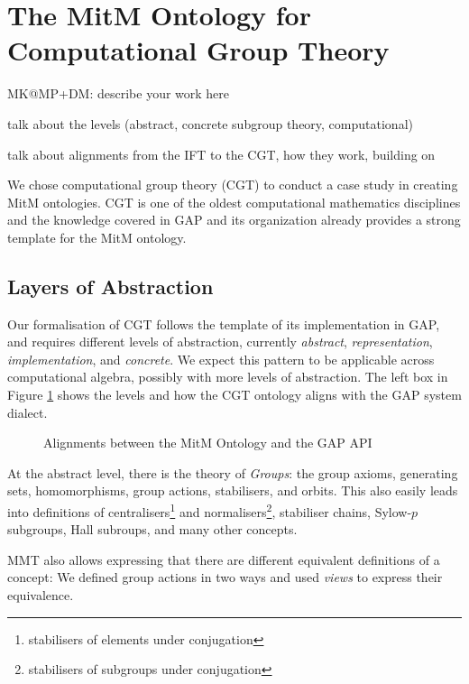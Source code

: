\section{The MitM Ontology for Computational Group Theory}\label{sec:cgt}
\begin{todolist}{MK@MP+DM: describe your work here}
\item talk about the levels (abstract, concrete subgroup theory, computational)
\item talk about alignments from the IFT to the CGT, how they work, building
  on~\cite{MueRoYuRa:abtafs17,MueGauKal:cacfms17} 
\end{todolist}

We chose computational group theory (CGT) to conduct a case study in creating MitM
ontologies. CGT is one of the oldest computational mathematics disciplines and the
knowledge covered in GAP and its organization already provides a strong template for the
MitM ontology.

\subsection{Layers of Abstraction}

Our formalisation of CGT follows the template of its implementation in GAP, and requires
different levels of abstraction, currently \emph{abstract}, \emph{representation},
\emph{implementation}, and \emph{concrete}.  We expect this pattern to be applicable
across computational algebra, possibly with more levels of abstraction. The left box in
Figure \ref{fig:cgtontology} shows the levels and how the CGT ontology aligns with the GAP
system dialect.

\begin{figure}[ht]\centering
  \caption{Alignments between the MitM Ontology and the GAP API}\label{fig:cgtontology}
\end{figure}

At the abstract level, there is the theory of \emph{Groups}: the group axioms,
generating sets, homomorphisms, group actions, stabilisers, and orbits. This
also easily leads into definitions of centralisers\footnote{stabilisers of
elements under conjugation} and normalisers\footnote{stabilisers of subgroups under
conjugation}, stabiliser chains, Sylow-$p$ subgroups, Hall subroups, and many
other concepts. 

MMT also allows expressing that there are different equivalent definitions of a
concept: We defined group actions in two ways and used \emph{views} to express
their equivalence.

